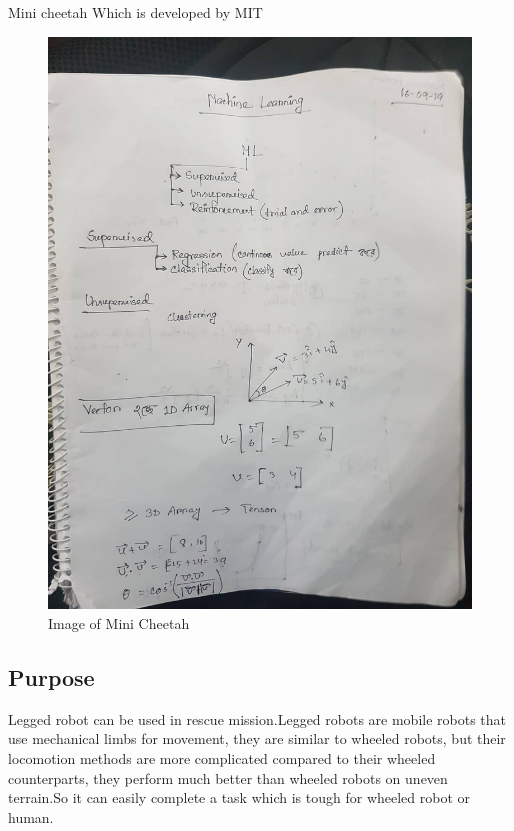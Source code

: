 \documentclass [a4paper ] {report}
\begin{document}
\begin{center}
Mini cheetah Which is developed by MIT\vadjust{\vskip 10mm \vskip 0pt}
\begin{figure}[h]
\begin{center}
  \includegraphics[scale=.3]{1.jpg}
\end{center}
  \caption{Image of Mini Cheetah \vadjust{\vskip 10mm \vskip 0pt}}
\label{fig:fig2}
\end{figure}
\end{center}
\hfill \break
\subsection{Purpose}
Legged robot can be used in rescue mission.Legged robots are mobile robots that use mechanical limbs for movement, they are similar to wheeled robots, but their locomotion methods are more complicated compared to their wheeled counterparts, they perform much better than wheeled robots on uneven terrain.So it can easily complete a task which is tough for wheeled robot or human. 
\end{document}
